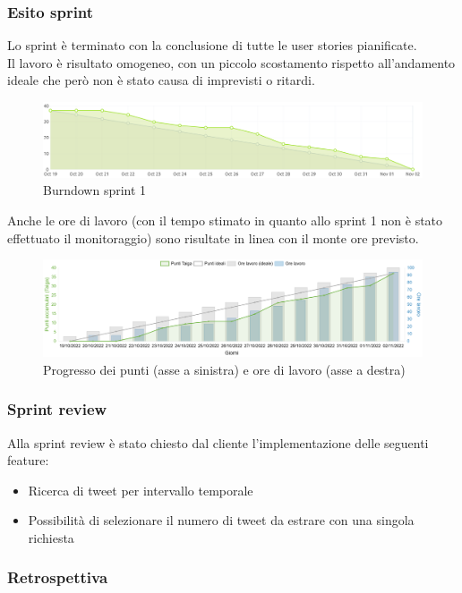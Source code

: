 \subsubsection{Esito sprint}
Lo sprint è terminato con la conclusione di tutte le user stories pianificate.\\
Il lavoro è risultato omogeneo, con un piccolo scostamento rispetto all'andamento ideale 
che però non è stato causa di imprevisti o ritardi.\\
\begin{figure}[H]
    \centering
    \includegraphics[width=15cm]{./img/sprint1/burndown.png}
    \caption{Burndown sprint 1}
\end{figure}
Anche le ore di lavoro (con il tempo stimato in quanto allo sprint 1 non è stato effettuato il monitoraggio) sono risultate in linea con il monte ore previsto.\\
\begin{figure}[H]
    \centering
    \includegraphics[width=15cm]{./img/sprint1/worktime.png}
    \caption{Progresso dei punti (asse a sinistra) e ore di lavoro (asse a destra)}
\end{figure}


\subsubsection{Sprint review}
Alla sprint review è stato chiesto dal cliente l'implementazione delle seguenti feature:
\begin{itemize}
    \item Ricerca di tweet per intervallo temporale
    \item Possibilità di selezionare il numero di tweet da estrare con una singola richiesta
\end{itemize}


\subsubsection{Retrospettiva}
